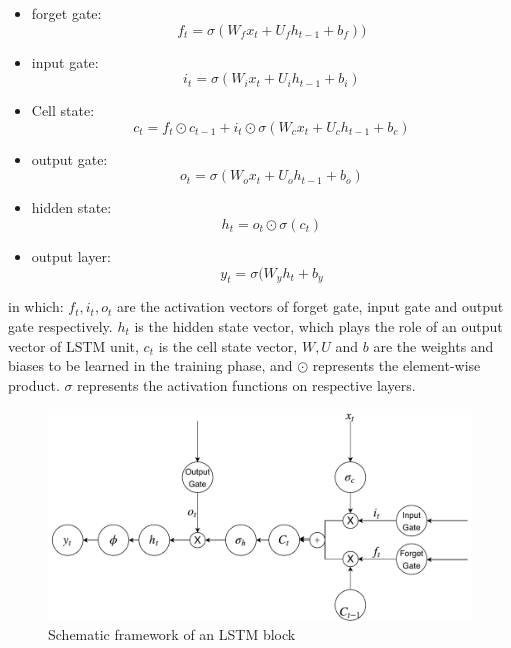 \begin{itemize}
    \item forget gate: 
    \begin{equation}
        f_t=\sigma(W_fx_t+U_fh_{t-1}+b_f))
    \end{equation}
    \item input gate:
    \begin{equation}
    i_t=\sigma(W_ix_t+U_ih_{t-1}+b_i)
    \end{equation}
    \item Cell state:
    \begin{equation}
    c_t=f_t\odot c_{t-1}+i_t\odot \sigma(W_cx_t+U_ch_{t-1}+b_c) 
    \end{equation}
    \item output gate:
    \begin{equation}
    o_t=\sigma(W_ox_t+U_oh_{t-1}+b_o)
    \end{equation}
    \item hidden state:
    \begin{equation}
    h_t=o_t\odot \sigma(c_t)
    \end{equation}
    \item output layer:
    \begin{equation}
    y_t=\sigma(W_{y}h_t+b_y
    \end{equation}
\end{itemize}
in which: \(f_t,i_t,o_t\) are the activation vectors of forget gate, input gate and output gate respectively. \(h_t\) is the hidden state vector, which plays the role of an output vector of LSTM unit, \(c_t\) is the cell state vector, \(W,U\) and \(b\) are the weights and biases to be learned in the training phase, and \(\odot\) represents the element-wise product. \(\sigma\) represents the activation functions on respective layers. 
\begin{figure}
    \centering
    \includegraphics[scale=0.6]{chapter_6/figures/lstm.pdf}
    \caption{Schematic framework of an LSTM block}
    \label{fig:LSTM}
\end{figure}

